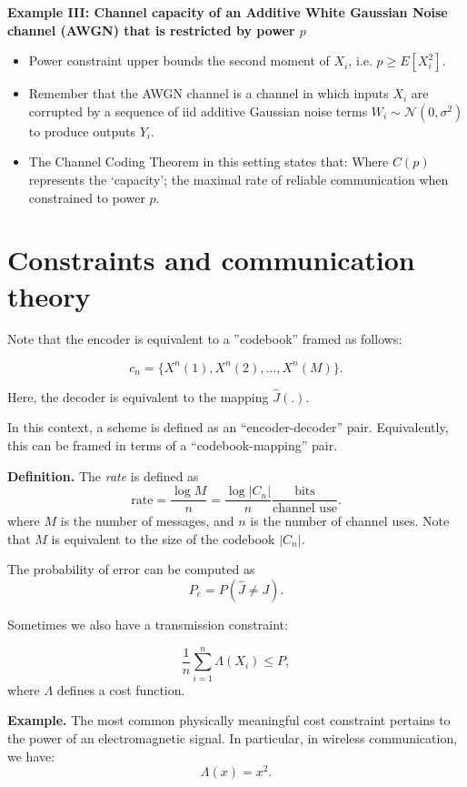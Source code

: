 \noindent\textbf{Example III:  Channel capacity of an Additive White Gaussian Noise channel (AWGN) that is restricted by power $p$}
\begin{itemize}
\item Power constraint upper bounds the second moment of $X_i$, i.e. $p \geq E\left[ X_i^2\right]$.
\item Remember that the AWGN channel is a channel in which inputs $X_i$ are corrupted by a sequence of iid additive Gaussian noise terms $W_i \sim \mathcal{N}(0, \sigma^2)$ to produce outputs $Y_i$.
\item The Channel Coding Theorem in this setting states that:
Where $C(p)$ represents the `capacity'; the maximal rate of reliable communication when constrained to power $p$.

\end{itemize}

\section{Constraints and communication theory}

Note that the encoder is equivalent to a ''codebook'' framed as follows:

\[
  c_n = \{ X^n (1), X^n (2), \dots, X^n (M) \}.
\]

Here, the decoder is equivalent to the mapping $\hat{J}(.)$.

In this context, a scheme is defined as an ``encoder-decoder'' pair.  Equivalently, this can be framed in terms of a ``codebook-mapping'' pair.

{\bf Definition.} The {\it rate} is defined as
\[
  \text{rate} = \frac{\log M}{n} = \frac{\log |C_n|}{n} \frac{\text{bits}}{\text{channel use}}.
\]
where $M$ is the number of messages, and $n$ is the number of channel uses.  Note that $M$ is equivalent to the size of the codebook $|C_n|$.

The probability of error can be computed as
\[
  P_e = P(\hat{J} \neq J).
\]

Sometimes we also have a transmission constraint:

\[
  \frac{1}{n} \sum_{i=1}^{n} \Lambda (X_i) \leq P,
\]
where $\Lambda$ defines a cost function.  

{\bf Example.} The most common physically meaningful cost constraint pertains to the power of an electromagnetic signal.  In particular, in wireless communication, we have:
\[
  \Lambda (x) = x^2.
\]

